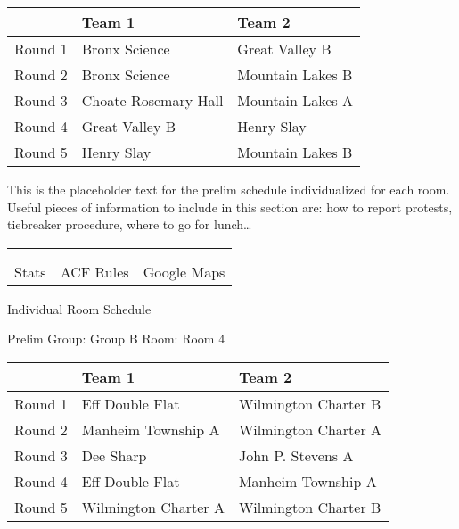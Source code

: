 \documentclass{article}%
\begin{document}
%
\begin{tabularx}{\textwidth}{|c|Y|Y|}%
\hline%
&Team 1&Team 2\\%
\hline%
Round 1&Bronx Science&Great Valley B\\%
Round 2&Bronx Science&Mountain Lakes B\\%
Round 3&Choate Rosemary Hall&Mountain Lakes A\\%
Round 4&Great Valley B&Henry Slay\\%
Round 5&Henry Slay&Mountain Lakes B\\%
\hline%
\end{tabularx}%
\vspace*{16pt}%
\linebreak%
This is the placeholder text for the prelim schedule individualized for each room. Useful pieces of information to include in this section are: how to report protests, tiebreaker procedure, where to go for lunch…%
\vspace*{30pt}%
\newline%
%
\begin{tabularx}{\textwidth}{YYY}%
  &  &  \\%
\\%
Stats&ACF Rules&Google Maps\\%
\end{tabularx}%
\newpage%
\begin{center}%
\begin{Huge}%
Individual Room Schedule%
\end{Huge}%
\vspace*{16pt}%
\linebreak%
\begin{Large}%
Prelim Group: Group B \hfill Room: Room 4%
\end{Large}%
\end{center}%
%
\begin{tabularx}{\textwidth}{|c|Y|Y|}%
\hline%
&Team 1&Team 2\\%
\hline%
Round 1&Eff Double Flat&Wilmington Charter B\\%
Round 2&Manheim Township A&Wilmington Charter A\\%
Round 3&Dee Sharp&John P. Stevens A\\%
Round 4&Eff Double Flat&Manheim Township A\\%
Round 5&Wilmington Charter A&Wilmington Charter B\\%
\hline%
\end{tabularx}%
\end{document}
